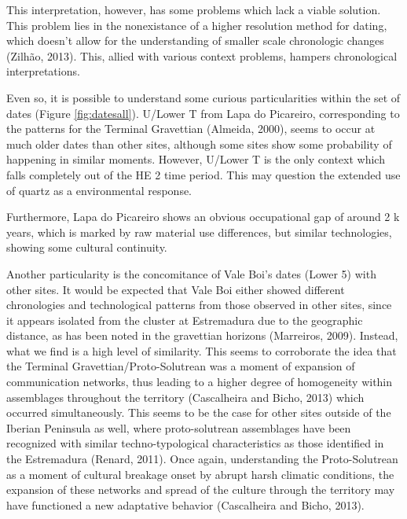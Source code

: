 \documentclass[12pt,twoside]{reedthesis}
\begin{document}
This interpretation, however, has some problems which lack a viable solution. This problem lies in the nonexistance of a higher resolution method for dating, which doesn't allow for the understanding of smaller scale chronologic changes (Zilhão, 2013). This, allied with various context problems, hampers chronological interpretations.

Even so, it is possible to understand some curious particularities within the set of dates (Figure \ref{fig:datesall}). U/Lower T from Lapa do Picareiro, corresponding to the patterns for the Terminal Gravettian (Almeida, 2000), seems to occur at much older dates than other sites, although some sites show some probability of happening in similar moments. However, U/Lower T is the only context which falls completely out of the HE 2 time period. This may question the extended use of quartz as a environmental response.

Furthermore, Lapa do Picareiro shows an obvious occupational gap of around 2 k years, which is marked by raw material use differences, but similar technologies, showing some cultural continuity.

Another particularity is the concomitance of Vale Boi's dates (Lower 5) with other sites. It would be expected that Vale Boi either showed different chronologies and technological patterns from those observed in other sites, since it appears isolated from the cluster at Estremadura due to the geographic distance, as has been noted in the gravettian horizons (Marreiros, 2009). Instead, what we find is a high level of similarity. This seems to corroborate the idea that the Terminal Gravettian/Proto-Solutrean was a moment of expansion of communication networks, thus leading to a higher degree of homogeneity within assemblages throughout the territory (Cascalheira and Bicho, 2013) which occurred simultaneously. This seems to be the case for other sites outside of the Iberian Peninsula as well, where proto-solutrean assemblages have been recognized with similar techno-typological characteristics as those identified in the Estremadura (Renard, 2011). Once again, understanding the Proto-Solutrean as a moment of cultural breakage onset by abrupt harsh climatic conditions, the expansion of these networks and spread of the culture through the territory may have functioned a new adaptative behavior (Cascalheira and Bicho, 2013).
\end{document}
